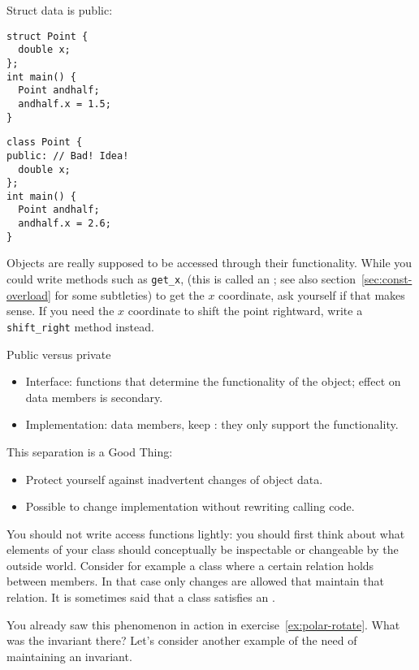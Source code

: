 \begin{multicols}{2}
Struct data is public:
\begin{lstlisting}
struct Point {
  double x;
};
int main() {
  Point andhalf;
  andhalf.x = 1.5;
}
\end{lstlisting}

\columnbreak

\begin{lstlisting}
class Point {
public: // Bad! Idea!
  double x;
};
int main() {
  Point andhalf;
  andhalf.x = 2.6;
}
\end{lstlisting}
\end{multicols}

Objects are really supposed to be accessed through their functionality.
While you could write methods such as \lstinline+get_x+,
(this is called an ;
see also section~\ref{sec:const-overload} for some subtleties)
to get the $x$ coordinate,
ask yourself if that makes sense.
If you need the $x$ coordinate to shift the point rightward,
write a \lstinline+shift_right+ method instead.

\begin{block}{Public versus private}
  \label{sl:interfaceimpl}
  \begin{itemize}
  \item Interface:  functions that determine the
    functionality of the object; effect on data members is secondary.
  \item Implementation: data members, keep : they
    only support the functionality.
  \end{itemize}
  This separation is a Good Thing:
  \begin{itemize}
  \item Protect yourself against inadvertent changes of object data.
  \item Possible to change implementation without rewriting calling code.
  \end{itemize}
\end{block}

You should not write access functions lightly: you should first think
about what elements of your class should conceptually be inspectable
or changeable by the outside world.  Consider for example a class
where a certain relation holds between members. In that case only
changes are allowed that maintain that relation.
It is sometimes said that a class satisfies an .

You already saw this phenomenon in action in exercise~\ref{ex:polar-rotate}.
What was the invariant there?
Let's consider another example of the need of maintaining an invariant.


